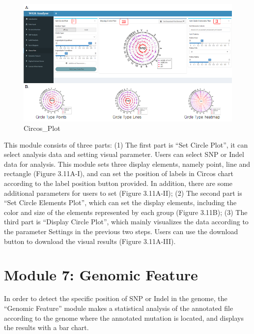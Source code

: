 \documentclass[
]{book}
\theoremstyle{definition}
\theoremstyle{definition}
\theoremstyle{definition}
\theoremstyle{definition}
\theoremstyle{remark}
\begin{document}
\begin{figure}
\includegraphics[width=1\linewidth]{figure/5.Circos_plot_1} \caption{Circos_Plot}\label{fig:unnamed-chunk-16}
\end{figure}

This module consists of three parts: (1) The first part is ``Set Circle Plot'', it can select analysis data and setting visual parameter. Users can select SNP or Indel data for analysis. This module sets three display elements, namely point, line and rectangle (Figure 3.11A-I), and can set the position of labels in Circos chart according to the label position button provided. In addition, there are some additional parameters for users to set (Figure 3.11A-II); (2) The second part is ``Set Circle Elements Plot'', which can set the display elements, including the color and size of the elements represented by each group (Figure 3.11B); (3) The third part is ``Display Circle Plot'', which mainly visualizes the data according to the parameter Settings in the previous two steps. Users can use the download button to download the visual results (Figure 3.11A-III).

\hypertarget{module-7-genomic-feature}{%
\section{Module 7: Genomic Feature}\label{module-7-genomic-feature}}

In order to detect the specific position of SNP or Indel in the genome, the ``Genomic Feature'' module makes a statistical analysis of the annotated file according to the genome where the annotated mutation is located, and displays the results with a bar chart.
\end{document}
